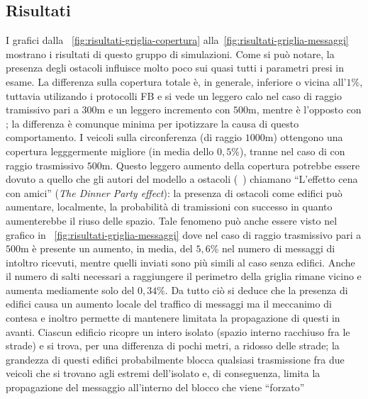 \subsection{Risultati}\label{sec:configurazione-griglia-risultati}
I grafici dalla \figurename~\ref{fig:risultati-griglia-copertura} alla~\ref{fig:risultati-griglia-messaggi}\footnotemark
{}
mostrano i risultati di questo gruppo di simulazioni.
Come si può notare, la presenza degli ostacoli influisce molto poco sui quasi tutti i parametri presi in esame.
La differenza sulla copertura totale è, in generale, inferiore o vicina all'$1\%$, tuttavia utilizando i protocolli FB e \statica{} si vede
un leggero calo nel caso di raggio tramissivo pari a $300$m e un leggero incremento con $500$m, mentre
è l'opposto con \staticb{}; la differenza è comunque minima per ipotizzare la causa di questo comportamento. %
I veicoli sulla circonferenza (di raggio $1000$m) ottengono una copertura legggermente migliore
(in media dello $0,5\%$), tranne nel caso di \staticb{} con raggio trasmissivo $500$m.
Questo leggero aumento della copertura potrebbe essere dovuto a quello che gli autori del modello a ostacoli (~\cite{Carpenter:2015:OMI:2756509.2756512})
chiamano ``L'effetto cena con amici'' (\textit{The Dinner Party effect}): la presenza di ostacoli come edifici
può aumentare, localmente, la probabilità di tramissioni con successo in quanto aumenterebbe il riuso delle spazio.
Tale fenomeno può anche essere visto nel grafico in \figurename~\ref{fig:risultati-griglia-messaggi}
dove nel caso di raggio trasmissivo pari a $500$m è presente un aumento, in media, del $5,6$\%
nel numero di messaggi di intoltro ricevuti, mentre quelli inviati sono più simili al caso senza edifici.
Anche il numero di salti necessari a raggiungere il perimetro della griglia rimane vicino
e aumenta mediamente solo del $0,34\%$.
Da tutto ciò si deduce che la presenza di edifici causa un aumento locale del traffico di messaggi
ma il meccanimo di contesa e inoltro permette di mantenere limitata la propagazione di questi in avanti. %
Ciascun edificio ricopre un intero isolato (spazio interno racchiuso fra le strade) e si trova, per una differenza di pochi metri,
a ridosso delle strade;
la grandezza di questi edifici probabilmente blocca qualsiasi trasmissione fra due veicoli che si trovano
agli estremi dell'isolato e, di conseguenza, limita la propagazione del messaggio all'interno del blocco  che viene ``forzato''
